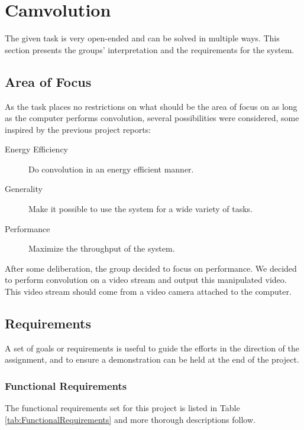 \section{Camvolution}
The given task\cite{assignment-text} is very open-ended and can be solved in multiple ways.
This section presents the groups' interpretation and the requirements for the system.

\subsection{Area of Focus}
As the task places no restrictions on what should be the area of focus on as long as the computer performs convolution, several possibilities were considered, some inspired by the previous project reports:

\begin{description}
    \item[Energy Efficiency] Do convolution in an energy efficient manner.
    \item[Generality] Make it possible to use the system for a wide variety of tasks.
    \item[Performance] Maximize the throughput of the system.
\end{description}

After some deliberation,
the group decided to focus on performance.
We decided to perform convolution on a video stream and output this manipulated video.
This video stream should come from a video camera attached to the computer.

\subsection{Requirements}
A set of goals or requirements is useful to guide the efforts in the direction of the assignment, and to ensure a demonstration can be held at the end of the project.

\subsubsection{Functional Requirements}
The functional requirements set for this project is listed in Table \ref{tab:FunctionalRequirements} and more thorough descriptions follow.

